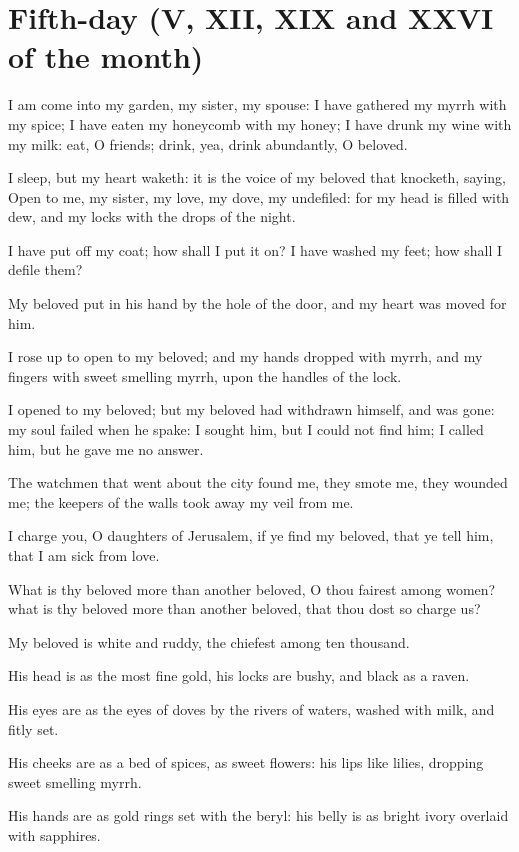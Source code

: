 \section*{Fifth-day (V, XII, XIX and XXVI of the month)}

I am come into my garden, my sister, my spouse: I have gathered my myrrh with my spice; I have eaten my honeycomb with my honey; I have drunk my wine with my milk: eat, O friends; drink, yea, drink abundantly, O beloved.

I sleep, but my heart waketh: it is the voice of my beloved that knocketh, saying, Open to me, my sister, my love, my dove, my undefiled: for my head is filled with dew, and my locks with the drops of the night.

I have put off my coat; how shall I put it on? I have washed my feet; how shall I defile them?

 My beloved put in his hand by the hole of the door, and my heart was moved for him.

I rose up to open to my beloved; and my hands dropped with myrrh, and my fingers with sweet smelling myrrh, upon the handles of the lock.

I opened to my beloved; but my beloved had withdrawn himself, and was gone: my soul failed when he spake: I sought him, but I could not find him; I called him, but he gave me no answer.

The watchmen that went about the city found me, they smote me, they wounded me; the keepers of the walls took away my veil from me.

 I charge you, O daughters of Jerusalem, if ye find my beloved, that ye tell him, that I am sick from love.

What is thy beloved more than another beloved, O thou fairest among women? what is thy beloved more than another beloved, that thou dost so charge us?

My beloved is white and ruddy, the chiefest among ten thousand.

His head is as the most fine gold, his locks are bushy, and black as a raven.

His eyes are as the eyes of doves by the rivers of waters, washed with milk, and fitly set.

His cheeks are as a bed of spices, as sweet flowers: his lips like lilies, dropping sweet smelling myrrh.

His hands are as gold rings set with the beryl: his belly is as bright ivory overlaid with sapphires.

